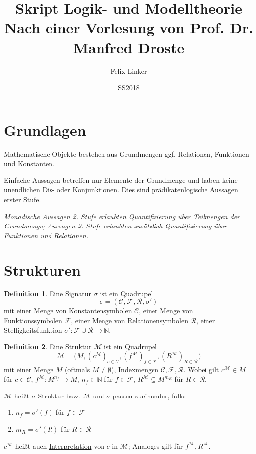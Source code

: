 \documentclass{article}
\title{Skript Logik- und Modelltheorie \\ \large{Nach einer Vorlesung von Prof. Dr. Manfred Droste}}
\author{Felix Linker}
\date{SS2018}
\theoremstyle{definition}
\newtheorem{dfn}{Definition}[section]
\theoremstyle{plain}
\newcommand{\m}[1]{\mathcal{#1}}
\newcommand{\sign}[1]{(\m{C}_{#1}, \m{F}_{#1}, \m{R}_{#1}, \sigma'_{#1})}
\newcommand{\struc}[3]{\big(#1, (c^{#2})_{c \in \m{C}_{#3}}, (f^{#2})_{f \in \m{F}_{#3}}, (R^{#2})_{R \in \m{R}_{#3}}\big)}
\begin{document}
    \maketitle

    \nocite{*}
    
    

    \section*{Grundlagen}

    Mathematische Objekte bestehen aus Grundmengen ggf. Relationen, Funktionen und Konstanten.

    Einfache Aussagen betreffen nur Elemente der Grundmenge und haben keine unendlichen Dis- oder Konjunktionen.
    Dies sind prädikatenlogische Aussagen erster Stufe.

    \textit{Monadische Aussagen 2. Stufe erlaubten Quantifizierung über Teilmengen der Grundmenge; Aussagen 2. Stufe erlaubten zusätzlich Quantifizierung über Funktionen und Relationen.}

    \section{Strukturen}

    \begin{dfn}
        Eine \underline{Signatur} $ \sigma $ ist ein Quadrupel
        \begin{equation}
            \sigma = \sign{}
        \end{equation}
        mit einer Menge von Konstantensymbolen $ \m{C} $, einer Menge von Funktionssymbolen $ \m{F} $, einer Menge von Relationensymbolen $ \m{R} $, einer Stelligkeitsfunktion $ \sigma' : \m{F} \cup \m{R} \rightarrow \mathbb{N} $.
    \end{dfn}

    \begin{dfn}
        Eine \underline{Struktur} $ \m{M} $ ist ein Quadrupel
        \begin{equation}
            \m{M} = \struc{M}{\m{M}}{}
        \end{equation}
        mit einer Menge $ M $ (oftmals $ M \neq \emptyset $), Indexmengen $ \m{C}, \m{F}, \m{R} $.
        Wobei gilt $ c^\m{M} \in M $ für $ c \in \m{C} $, $ f^\m{M} : M^{n_f} \rightarrow M $, $ n_f \in \mathbb{N} $ für $ f \in \m{F} $, $ R^\m{M} \subseteq M^{m_R} $ für $ R \in \m{R} $.

        $ \m{M} $ heißt \underline{$ \sigma $-Struktur} bzw. $ \m{M} $ und $ \sigma $ \underline{passen zueinander}, falls:
        \begin{enumerate}
            \item $ n_f = \sigma'(f) $ für $ f \in \m{F} $
            \item $ m_R = \sigma'(R) $ für $ R \in \m{R} $
        \end{enumerate}

        $ c^\m{M} $ heißt auch \underline{Interpretation} von $ c $ in $ \m{M} $; Analoges gilt für $ f^\m{M}, R^\m{M} $.
    \end{dfn}
\end{document}
